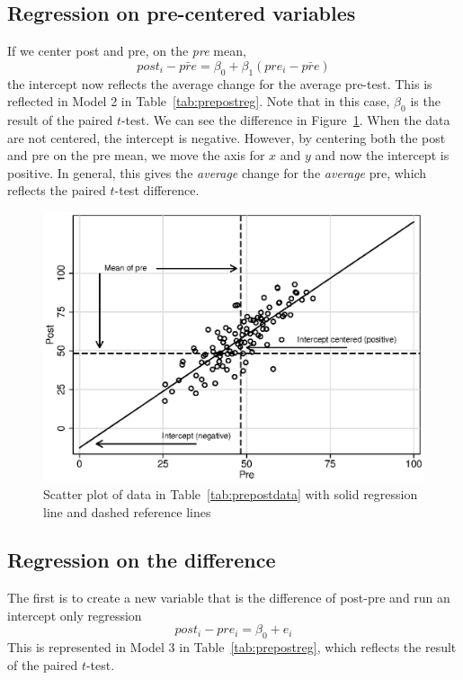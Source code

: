 \subsection{Regression on pre-centered variables}

If we center post and pre, on the {\it pre} mean,
\begin{equation}
post_i-\bar{pre} = \beta_0+\beta_1\left(pre_i-\bar{pre}\right)
\end{equation}
the intercept now reflects the average change for the average pre-test. This is reflected in Model 2 in Table~\ref{tab:prepostreg}. Note that in this case, $\beta_0$ is the result of the paired $t$-test. We can see the difference in Figure~\ref{fig:prepostreg}. When the data are not centered, the intercept is negative. However, by centering both the post and pre on the pre mean, we move the axis for $x$ and $y$ and now the intercept is positive. In general, this gives the {\it average} change for the {\it average} pre, which reflects the paired $t$-test difference.

\begin{figure}
   \centering
   \includegraphics[angle=0,
           width=.75\textwidth]{prepostreg.eps}
   \caption{Scatter plot of data in Table~\ref{tab:prepostdata} with solid regression line and dashed reference lines}
  \label{fig:prepostreg}
\end{figure}

\subsection{Regression on the difference}

The first is to create a new variable that is the difference of post-pre and run an intercept only regression
\begin{equation}
post_i - pre_i = \beta_0 + e_i
\end{equation}
This is represented in Model 3 in Table~\ref{tab:prepostreg}, which reflects the result of the paired $t$-test.

